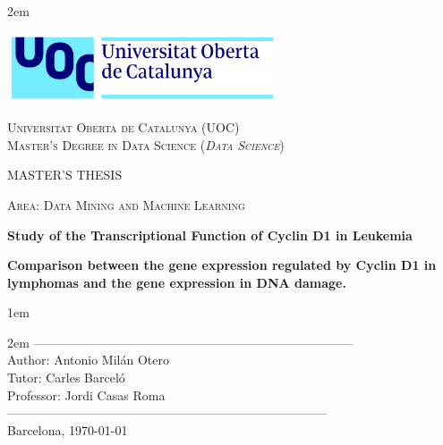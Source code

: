 \newpage
\thispagestyle{empty}

\baselineskip 2em


\centerline{\includegraphics[width=0.6\textwidth]{../images/UOC-logo}}
\begin{center}
\textsc{Universitat Oberta de Catalunya (UOC) \\
 Master's Degree in Data Science (\textit{Data Science})\\}


\vspace*{1.5cm}

\textsc{\Large MASTER'S THESIS}

\vspace*{0.5cm}

\textsc{\large Area: Data Mining and Machine Learning}



\vspace*{2.0cm}

\textbf{\Large Study of the Transcriptional Function of Cyclin D1 in Leukemia}

\textbf{\large Comparison between the gene expression regulated by Cyclin D1 in lymphomas and the gene expression in DNA damage.}

\vspace{2.5cm}
\baselineskip 1em

\baselineskip 2em
-----------------------------------------------------------------------------\\
Author:     Antonio Milán Otero\\
Tutor:      Carles Barceló\\
Professor:  Jordi Casas Roma\\
-----------------------------------------------------------------------------\\
\vspace*{1.5cm}
Barcelona, \today

\end{center}

\newpage
\pagestyle{empty}
\hfill

